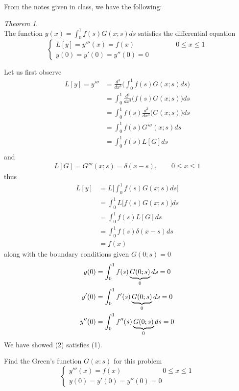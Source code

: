 \documentclass[12pt]{article}
\newenvironment{subproblem}[2][Part]{\begin{trivlist}
  \item[\hskip \labelsep {\bfseries #1}\hskip \labelsep {\bfseries (#2)}]}{\end{trivlist}}
\newenvironment{solution}[1][Solution]{\begin{trivlist}
  \item[\hskip \labelsep {\bfseries #1} \hskip \labelsep]}{\end{trivlist}}
\theoremstyle{remark}
\newtheorem*{theorem*}{Theorem}
\begin{document}
\begin{solution}
  $ $\\
  From the notes given in class, we have the following:
  \begin{theorem*}{}
    $ $\\
    The function \(y(x) = \int_{0}^{1}f(s)G(x;s)ds\)
    satisfies the differential equation
    \[
      \left\{
        \begin{array}{ll}
          L[y] = y'''(x) = f(x) \qquad\qquad\qquad 0 \le x \le 1 \\
          y(0) = y'(0) = y''(0) = 0
        \end{array}
      \right.
    \]
  \end{theorem*}
  $ $\\
  Let us first observe
  \begin{align*}
    L[y] = y''' &= \frac{d^3}{dx^3}\big(\int_{0}^{1}f(s)G(x;s)ds\big) \\
                &= \int_{0}^{1}\frac{d^3}{dx^3}\big(f(s)G(x;s)\big)ds \\
                &= \int_{0}^{1}f(s)\frac{d^3}{dx^3}\big(G(x;s)\big)ds \\
                &= \int_{0}^{1}f(s)G'''(x;s)ds \\
                &= \int_{0}^{1}f(s)L[G]ds \\
  \end{align*}
  and
  \begin{align*}
    L[G] = G'''(x;s) = \delta(x-s), \qquad 0 \le x \le 1
  \end{align*}
  thus
  \begin{align*}
    L[y] &= L\bigg[\int_{0}^{1}f(s)G(x;s)ds \bigg] \\
         &= \int_{0}^{1}L\bigg[f(s)G(x;s)\bigg] ds \\
         &= \int_{0}^{1}f(s)L[G]ds \\
         &= \int_{0}^{1}f(s)\delta(x-s)ds \\
         &= f(x)
  \end{align*}
  along with the boundary conditions given \(G(0;s) = 0\)
  \begin{align*}
    y(0) &= \int_{0}^{1}f(s)\underbrace{G(0;s)}_{\text 0}ds = 0 \\
    y'(0) &= \int_{0}^{1}f'(s)\underbrace{G(0;s)}_{\text 0}ds = 0 \\
    y''(0) &= \int_{0}^{1}f''(s)\underbrace{G(0;s)}_{\text 0}ds = 0 \\
  \end{align*}
  We have showed (2) satisfies (1).
\end{solution}
\clearpage
\begin{subproblem}{b}
  Find the Green's function \(G(x:s)\) for this problem
  \[
    \left\{
      \begin{array}{ll}
        y'''(x) = f(x) \qquad\qquad\qquad 0 \le x \le 1 \\
        y(0) = y'(0) = y''(0) = 0
      \end{array}
    \right.
  \]
\end{subproblem}
\end{document}
